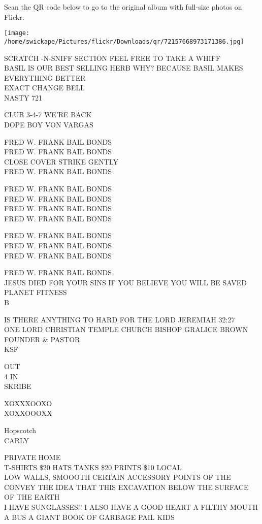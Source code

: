 \documentclass[10pt,letterpaper]{article}
\begin{document}
Scan the QR code below to go to the original album with full-size photos on Flickr:

\texttt{[image: /home/swickape/Pictures/flickr/Downloads/qr/72157668973171386.jpg]}
\pagebreak

SCRATCH {-}N{-}SNIFF SECTION FEEL FREE TO TAKE A WHIFF\\
BASIL IS OUR BEST SELLING HERB WHY?  BECAUSE BASIL MAKES EVERYTHING BETTER\\
EXACT CHANGE BELL\\
NASTY 721

CLUB 3{-}4{-}7 WE'RE BACK\\
DOPE BOY VON VARGAS

FRED W. FRANK BAIL BONDS\\
FRED W. FRANK BAIL BONDS\\
CLOSE COVER STRIKE GENTLY\\
FRED W. FRANK BAIL BONDS

FRED W. FRANK BAIL BONDS\\
FRED W. FRANK BAIL BONDS\\
FRED W. FRANK BAIL BONDS\\
FRED W. FRANK BAIL BONDS

FRED W. FRANK BAIL BONDS\\
FRED W. FRANK BAIL BONDS\\
FRED W. FRANK BAIL BONDS

FRED W. FRANK BAIL BONDS\\
JESUS DIED FOR YOUR SINS IF YOU BELIEVE YOU WILL BE SAVED\\
PLANET FITNESS\\
B

IS THERE ANYTHING TO HARD FOR THE LORD JEREMIAH 32:27\\
ONE LORD CHRISTIAN TEMPLE CHURCH BISHOP GRALICE BROWN FOUNDER \& PASTOR\\
KSF

OUT\\
4 IN\\
SKRIBE

XOXXXOOXO\\
XOXXOOOXX

Hopscotch\\
CARLY

PRIVATE HOME\\
T{-}SHIRTS \$20 HATS TANKS \$20 PRINTS \$10 LOCAL\\
LOW WALLS, SMOOOTH CERTAIN ACCESSORY POINTS OF THE CONVEY THE IDEA THAT THIS EXCAVATION BELOW THE SURFACE OF THE EARTH\\
I HAVE SUNGLASSES!!  I ALSO HAVE A GOOD HEART A FILTHY MOUTH A BUS A GIANT BOOK OF GARBAGE PAIL KIDS
\end{document}
